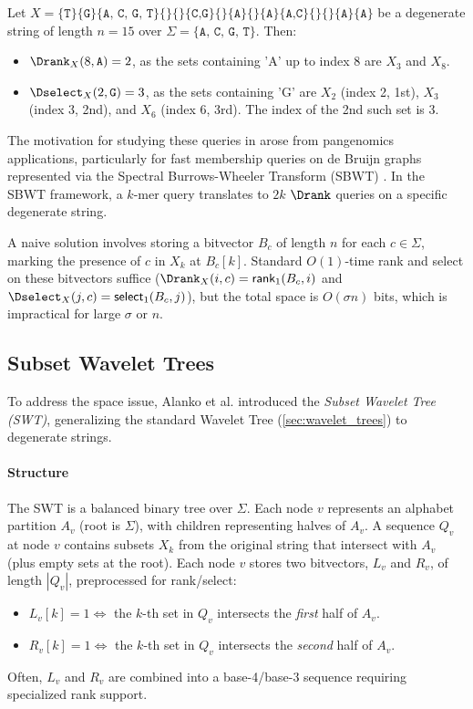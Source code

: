 \begin{example}
    Let $X = \{\texttt{T}\} \{\texttt{G}\} \{\texttt{A, C, G, T}\} \{\} \{\} \{\texttt{C,G}\} \{\} \{\texttt{A}\} \{\} \{\texttt{A}\} \{\texttt{A,C}\} \{\} \{\} \{\texttt{A}\} \{\texttt{A}\}$ be a degenerate string of length $n=15$ over $\Sigma = \{\texttt{A, C, G, T}\}$. Then:
    \begin{itemize}
        \item $\Drank_X(8, \texttt{A}) = 2$, as the sets containing 'A' up to index 8 are $X_3$ and $X_8$.
        \item $\Dselect_X(2, \texttt{G}) = 3$, as the sets containing 'G' are $X_2$ (index 2, 1st), $X_3$ (index 3, 2nd), and $X_6$ (index 6, 3rd). The index of the 2nd such set is 3.
    \end{itemize}
\end{example}

The motivation for studying these queries in \cite{SubsetWT} arose from pangenomics applications, particularly for fast membership queries on de Bruijn graphs represented via the Spectral Burrows-Wheeler Transform (SBWT) \cite{alanko2023small}. In the SBWT framework, a $k$-mer query translates to $2k$ $\Drank$ queries on a specific degenerate string.

A naive solution involves storing a bitvector $B_c$ of length $n$ for each $c \in \Sigma$, marking the presence of $c$ in $X_k$ at $B_c[k]$. Standard $O(1)$-time \textsf{rank} and \textsf{select} on these bitvectors suffice ($\Drank_X(i, c) = \textsf{rank}_1(B_c, i)$ and $\Dselect_X(j, c) = \textsf{select}_1(B_c, j)$), but the total space is $O(\sigma n)$ bits, which is impractical for large $\sigma$ or $n$.

\subsection{Subset Wavelet Trees}

To address the space issue, Alanko et al. \cite{SubsetWT} introduced the \emph{Subset Wavelet Tree (SWT)}, generalizing the standard Wavelet Tree (\autoref{sec:wavelet_trees}) to degenerate strings.

\paragraph{Structure} The SWT is a balanced binary tree over $\Sigma$. Each node $v$ represents an alphabet partition $A_v$ (root is $\Sigma$), with children representing halves of $A_v$. A sequence $Q_v$ at node $v$ contains subsets $X_k$ from the original string that intersect with $A_v$ (plus empty sets at the root). Each node $v$ stores two bitvectors, $L_v$ and $R_v$, of length $|Q_v|$, preprocessed for rank/select:
\begin{itemize}
    \item $L_v[k] = 1 \iff$ the $k$-th set in $Q_v$ intersects the \emph{first} half of $A_v$.
    \item $R_v[k] = 1 \iff$ the $k$-th set in $Q_v$ intersects the \emph{second} half of $A_v$.
\end{itemize}
Often, $L_v$ and $R_v$ are combined into a base-4/base-3 sequence requiring specialized rank support.


